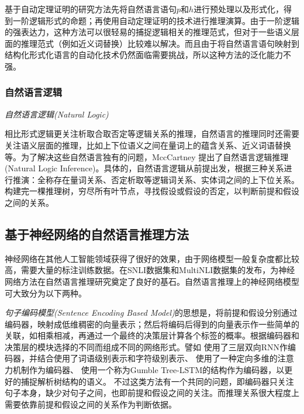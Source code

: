 \documentclass[UTF8,11pt,a4paper,nofonts]{ctexart}
\begin{document}
基于自动定理证明的研究方法\cite{Bos2005RecognisingTE, Abzianidze2017APL}先将自然语言语句$p$和$h$进行预处理以及形式化，得到一阶逻辑形式的命题；再使用自动定理证明\cite{Chang1973SymbolicLA}的技术进行推理演算。由于一阶逻辑的强表达力，这种方法可以很轻易的捕捉逻辑相关的推理范式，但对于一些语义层面的推理范式（例如近义词替换）比较难以解决。而且由于将自然语言语句映射到结构化形式化语言的自动化技术仍然面临需要挑战，所以这种方法的泛化能力不强。

\subsubsection{自然语言逻辑}

\textit{自然语言逻辑(Natural Logic)}

相比形式逻辑更关注析取合取否定等逻辑关系的推理，自然语言的推理同时还需要关注语义层面的推理，比如上下位语义之间在量词上的蕴含关系、近义词语替换等。为了解决这些自然语言独有的问题，MccCartney 提出了自然语言逻辑推理(Natural Logic Inference)\cite{MacCartney2007NaturalLF, Angeli2014NaturalLINL, }。具体的，自然语言逻辑从前提出发，根据三种关系进行推演：全称存在量词关系、否定析取等逻辑词关系、实体词之间的上下位关系。构建完一棵推理树，穷尽所有叶节点，寻找假设或假设的否定，以判断前提和假设之间的关系。



\subsection{基于神经网络的自然语言推理方法}

神经网络在其他人工智能领域获得了很好的效果，由于网络模型一般复杂度都比较高，需要大量的标注训练数据。在SNLI数据集\cite{Bowman2015ALA}和MultiNLI数据集\cite{Nangia2017TheR2}的发布，为神经网络方法在自然语言推理研究奠定了良好的基石。自然语言推理上的神经网络模型可大致分为以下两种。

\textit{句子编码模型(Sentence Encoding Based Model)}\cite{Conneau2017SupervisedLO, Yu2017NeuralSE, Chen2017RecurrentNN, Shen2017DiSAN, Choi2017LearningTC}的思想是，将前提和假设分别通过编码器，映射成低维稠密的向量表示；然后将编码后得到的向量表示作一些简单的关联，如相乘相减，再通过一个最终的决策层计算各个标签的概率。根据编码器和决策层的模块选择的不同而组成不同的网络形式。譬如
\cite{Chen2017RecurrentNN}使用了三层双向RNN作编码器，并结合使用了词语级别表示和字符级别表示、
\cite{Shen2017DiSAN}使用了一种定向多维的注意力机制作为编码器、
\cite{Choi2017LearningTC}使用一个称为Gumble Tree-LSTM的结构作为编码器，以更好的捕捉解析树结构的语义。
不过这类方法有一个共同的问题，即编码器只关注句子本身，缺少对句子之间，也即前提和假设之间的关注。而推理关系很大程度上需要依靠前提和假设之间的关系作为判断依据。
\end{document}
